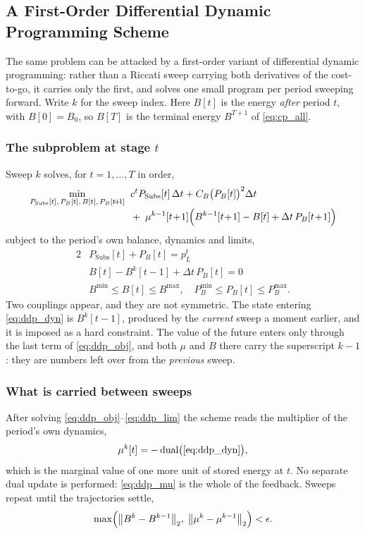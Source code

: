 \subsection{A First-Order Differential Dynamic Programming Scheme}
\label{subsec:userddp}

The same problem can be attacked by a first-order variant of differential
dynamic programming: rather than a Riccati sweep carrying both derivatives of
the cost-to-go, it carries only the first, and solves one small program per
period sweeping forward.  Write $k$ for the sweep index.  Here
$B[t]$ is the energy \emph{after} period $t$, with $B[0] = B_0$, so $B[T]$ is
the terminal energy $B^{T+1}$ of \eqref{eq:cp_all}.

\subsubsection{The subproblem at stage $t$}
Sweep $k$ solves, for $t = 1, \dots, T$ in order,
\begin{align}
\min_{P_{\text{Subs}}[t],\, P_B[t],\, B[t],\, P_B[t\!+\!1]} \;\;
  & c^t P_{\text{Subs}}[t]\,\Delta t + C_B \bigl(P_B[t]\bigr)^2 \Delta t
\nonumber \\[-2pt]
  & +\; \mu^{k-1}[t\!+\!1] \Bigl( B^{k-1}[t\!+\!1] - B[t]
        + \Delta t\, P_B[t\!+\!1] \Bigr)
\label{eq:ddp_obj}
\end{align}
subject to the period's own balance, dynamics and limits,
\begin{alignat}{2}
& P_{\text{Subs}}[t] + P_B[t] = p_L^t
\label{eq:ddp_bal} \\
& B[t] - B^{k}[t\!-\!1] + \Delta t\, P_B[t] = 0
\label{eq:ddp_dyn} \\
& B^{\min} \leq B[t] \leq B^{\max}, \quad
  P_B^{\min} \leq P_B[t] \leq P_B^{\max} .
\label{eq:ddp_lim}
\end{alignat}
Two couplings appear, and they are not symmetric.  The state entering
\eqref{eq:ddp_dyn} is $B^{k}[t\!-\!1]$, produced by the \emph{current} sweep a
moment earlier, and it is imposed as a hard constraint.  The value of the future
enters only through the last term of \eqref{eq:ddp_obj}, and both $\mu$ and $B$
there carry the superscript $k\!-\!1$: they are numbers left over from the
\emph{previous} sweep.

\subsubsection{What is carried between sweeps}
After solving \eqref{eq:ddp_obj}--\eqref{eq:ddp_lim} the scheme reads the
multiplier of the period's own dynamics,
\begin{equation}
\mu^{k}[t] = -\,\text{dual}\bigl(\eqref{eq:ddp_dyn}\bigr),
\label{eq:ddp_mu}
\end{equation}
which is the marginal value of one more unit of stored energy at $t$.  No
separate dual update is performed: \eqref{eq:ddp_mu} is the whole of the
feedback.  Sweeps repeat until the trajectories settle,
\begin{equation}
\max\Bigl(
  \bigl\| B^{k} - B^{k-1} \bigr\|_2,\;
  \bigl\| \mu^{k} - \mu^{k-1} \bigr\|_2
\Bigr) < \epsilon .
\label{eq:ddp_conv}
\end{equation}

